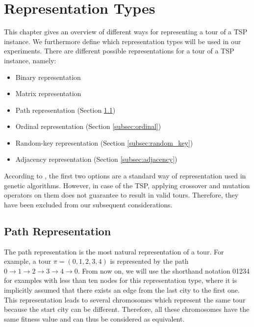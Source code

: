 \section{Representation Types}
\label{sec:representation_types}

This chapter gives an overview of different ways for representing a tour of a TSP instance. We furthermore define which representation types will be used in our experiments.
There are different possible representations for a tour of a TSP instance, namely:

\begin{itemize}
	\item Binary representation
	\item Matrix representation
	\item Path representation (Section \ref{subsec:path})
	\item Ordinal representation (Section \ref{subsec:ordinal})
	\item Random-key representation (Section \ref{subsec:random_key})
	\item Adjacency representation (Section \ref{subsec:adjacency})
\end{itemize}

According to \citeauthor{larranaga1999genetic} \cite{larranaga1999genetic}, the first two options are a standard way of representation used in genetic algorithms. However, in case of the TSP, applying crossover and mutation operators on them does not guarantee to result in valid tours. Therefore, they have been excluded from our subsequent considerations.

\subsection{Path Representation}
\label{subsec:path}

The path  representation  is  the  most  natural  representation  of  a  tour.  For  example, a tour $\pi = (0, 1, 2, 3, 4)$ is represented by the path $0\rightarrow1\rightarrow2\rightarrow3\rightarrow4\rightarrow0$. From now on, we will use the shorthand notation 01234 for examples with less than ten nodes for this representation type, where it is implicitly assumed that there exists an edge from the last city to the first one.
This representation leads to several chromosomes which represent the same tour because the start city can be different. Therefore, all these chromosomes have the same fitness value and can thus be considered as equivalent.\par

